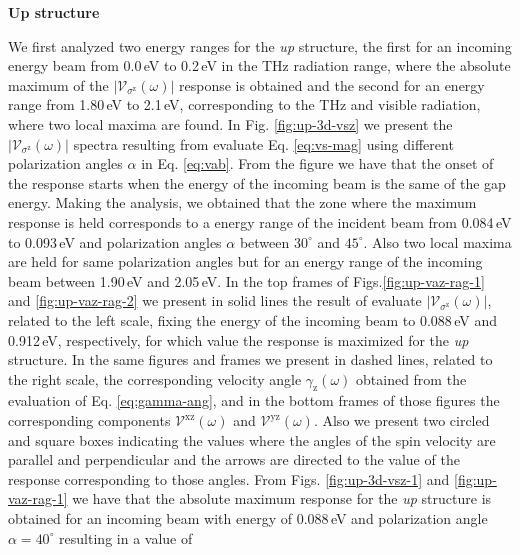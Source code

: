 \documentclass[prb,11pt,tightenlines,twocolumn,aps]{revtex4-1}
\begin{document}
\textbf{Up structure}

We first analyzed two energy ranges for the \emph{up} structure, the first for
an incoming energy beam from 0.0\,eV to 0.2\,eV in the THz radiation range,
where the absolute maximum of the $|\mathcal{V}_{\sigma^{\mathrm{z}}}(\omega)|$
response is obtained and the second for an energy range from 1.80\,eV to
2.1\,eV, corresponding to the THz and visible radiation, where two local maxima
are found.
% 
In Fig. \ref{fig:up-3d-vsz} we present the
$|\mathcal{V}_{\sigma^{\mathrm{z}}}(\omega)|$ spectra resulting from evaluate
Eq. \eqref{eq:vs-mag} using different polarization angles $\alpha$ in Eq.
\eqref{eq:vab}. From the figure we have that the onset of the response starts
when the energy of the incoming beam is the same of the gap energy.
% 
Making the analysis, we obtained that the zone where the maximum response is
held corresponds to a energy range of the incident beam from 0.084\,eV to
0.093\,eV and polarization angles $\alpha$ between $30^{\circ}$ and
$45^{\circ}$. Also two local maxima are held for same polarization angles but
for an energy range of the incoming beam between 1.90\,eV and 2.05\,eV.
In the top frames of Figs.\ref{fig:up-vaz-rag-1} and \ref{fig:up-vaz-rag-2} we
present in solid lines the result of evaluate
$|\mathcal{V}_{\sigma^{\mathrm{z}}}(\omega)|$, related to the left scale, fixing
the energy of the incoming beam to 0.088\,eV and 0.912\,eV, respectively, for
which value the response is maximized for the \emph{up} structure. In the same
figures and frames we present in dashed lines, related to the right scale, the
corresponding velocity angle $\gamma_{\mathrm{z}}(\omega)$ obtained from the
evaluation of Eq. \eqref{eq:gamma-ang}, and in the bottom frames of those
figures the corresponding components $\mathcal{V}^{\mathrm{xz}}(\omega)$ and
$\mathcal{V}^{\mathrm{yz}}(\omega)$. Also we present two circled and square
boxes indicating the values where the angles of the spin velocity are parallel
and perpendicular and the arrows are directed to the value of the response
corresponding to those angles.
% 
From Figs. \ref{fig:up-3d-vsz-1} and \ref{fig:up-vaz-rag-1} we have that the
absolute maximum response for the \emph{up} structure is obtained for an
incoming beam with energy of 0.088\,eV and polarization angle
$\alpha=40^{\circ}$ resulting in a value of
\end{document}
